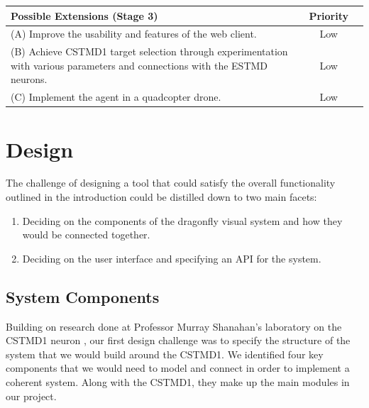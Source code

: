 \documentclass[a4paper,11pt]{article}
\begin{document}
\begin{center}
    \begin{tabular}{p{12cm} c c}
    \textbf{Possible Extensions (Stage 3)} & \textbf{Priority} \\ \hline
	(A) Improve the usability and features of the web client. & Low\\
	(B) Achieve CSTMD1 target selection through experimentation with various parameters and connections with the ESTMD neurons. & Low\\
	(C) Implement the agent in a quadcopter drone. & Low\\
    \end{tabular}
\end{center}






\clearpage
\section{Design}

The challenge of designing a tool that could satisfy the overall functionality outlined in the introduction could be distilled down to two main facets:
\begin{enumerate}
\item Deciding on the components of the dragonfly visual system and how they would be connected together.
\item Deciding on the user interface and specifying an API for the system.
\end{enumerate}

\subsection{System Components}

Building on research done at Professor Murray Shanahan's laboratory on the CSTMD1 neuron \cite{?}, our first design challenge was to specify the structure of the system that we would build around the CSTMD1. We identified four key components that we would need to model and connect in order to implement a coherent system. Along with the CSTMD1, they make up the main modules in our project.
\end{document}
